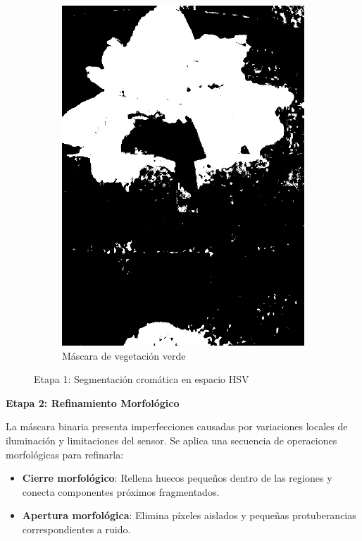 \begin{figure}[H]
\begin{subfigure}[b]{0.48\textwidth}
    \includegraphics[width=\textwidth]{imagenes/clasificador_2_verde.jpg}
    \caption{Máscara de vegetación verde}
\end{subfigure}
\caption{Etapa 1: Segmentación cromática en espacio HSV}
\label{fig:clasificador_etapa1}
\end{figure}

\textbf{Etapa 2: Refinamiento Morfológico}

La máscara binaria presenta imperfecciones causadas por variaciones locales de iluminación y limitaciones del sensor. Se aplica una secuencia de operaciones morfológicas para refinarla:

\begin{itemize}
    \item \textbf{Cierre morfológico}: Rellena huecos pequeños dentro de las regiones y conecta componentes próximos fragmentados.
    \item \textbf{Apertura morfológica}: Elimina píxeles aislados y pequeñas protuberancias correspondientes a ruido.
\end{itemize}

